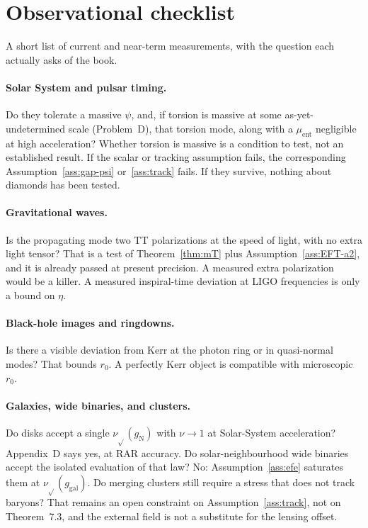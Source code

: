 \section{Observational checklist}
\label{sec:ch16-obs}

A short list of current and near-term measurements, with the
question each actually asks of the book.

\paragraph{Solar System and pulsar timing.}
Do they tolerate a massive \(\psi\), and, if torsion is massive at
some as-yet-undetermined scale (Problem~D), that torsion mode, along
with a \(\mu_{\mathrm{ent}}\) negligible at high acceleration? Whether
torsion is massive is a condition to test, not an established result.
If the scalar or tracking assumption fails, the corresponding
Assumption~\ref{ass:gap-psi} or~\ref{ass:track} fails. If they
survive, nothing about diamonds has been tested.

\paragraph{Gravitational waves.}
Is the propagating mode two TT polarizations at the speed of
light, with no extra light tensor? That is a test of
Theorem~\ref{thm:mT} plus Assumption~\ref{ass:EFT-a2}, and it is
already passed at present precision. A measured extra
polarization would be a killer. A measured inspiral-time
deviation at LIGO frequencies is only a bound on \(\eta\).

\paragraph{Black-hole images and ringdowns.}
Is there a visible deviation from Kerr at the photon ring or in
quasi-normal modes? That bounds \(r_0\). A perfectly Kerr object
is compatible with microscopic \(r_0\).

\paragraph{Galaxies, wide binaries, and clusters.}
Do disks accept a single \(\nu_{\sqrt{}}(g_{\mathrm{N}})\) with
\(\nu\to 1\) at Solar-System acceleration?
Appendix~D says yes, at RAR accuracy.
Do solar-neighbourhood wide binaries accept the isolated
evaluation of that law?
No: Assumption~\ref{ass:efe} saturates them at
\(\nu_{\sqrt{}}(g_{\mathrm{gal}})\).
Do merging clusters still require a stress that does not track
baryons?
That remains an open constraint on Assumption~\ref{ass:track}, not on
Theorem~7.3, and the external field is not a substitute for the
lensing offset.

